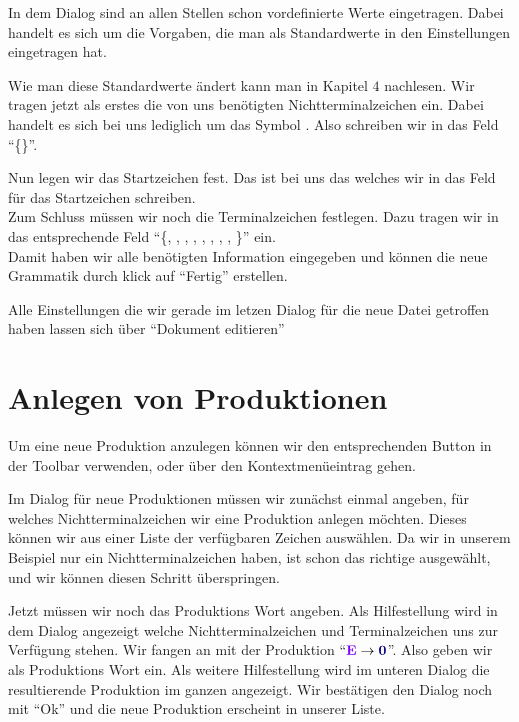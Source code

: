 In dem Dialog sind an allen Stellen schon vordefinierte Werte eingetragen.
Dabei handelt es sich um die Vorgaben, die man als Standardwerte in den
Einstellungen eingetragen hat.

Wie man diese Standardwerte ändert kann man in Kapitel $4$ nachlesen. Wir tragen
jetzt als erstes die von uns benötigten Nichtterminalzeichen ein. Dabei handelt
es sich bei uns lediglich um das Symbol . Also schreiben wir in
das Feld "`\{\}"'.\vspace{10pt}

Nun legen wir das Startzeichen fest. Das ist bei uns das 
welches wir in das Feld für das Startzeichen schreiben.\\
Zum Schluss müssen wir noch die Terminalzeichen festlegen. Dazu tragen
wir in das entsprechende Feld "`\{, ,
, , \TerminalSymbol{-}, \TerminalSymbol{+},
\TerminalSymbol{*}, \TerminalSymbol{(}, \TerminalSymbol{)}\}"' ein.\\ Damit
haben wir alle benötigten Information eingegeben und können die neue Grammatik durch klick auf "`Fertig"' erstellen.\vspace{10pt}

Alle Einstellungen die wir gerade im letzen Dialog für die neue Datei getroffen
haben lassen sich über "`Dokument editieren"'

\section{Anlegen von Produktionen}

Um eine neue Produktion anzulegen können wir den entsprechenden Button in der
Toolbar verwenden, oder über den Kontextmenüeintrag gehen.\vspace{10pt}

Im Dialog für neue Produktionen müssen wir zunächst einmal angeben, für welches
Nichtterminalzeichen wir eine Produktion anlegen möchten. Dieses können wir aus
einer Liste der verfügbaren Zeichen auswählen. Da wir in unserem Beispiel nur
ein Nichtterminalzeichen haben, ist schon das richtige ausgewählt, und wir
können diesen Schritt überspringen.\vspace{10pt}

Jetzt müssen wir noch das Produktions Wort angeben. Als Hilfestellung wird in
dem Dialog angezeigt welche Nichtterminalzeichen und Terminalzeichen uns zur
Verfügung stehen. Wir fangen an mit der Produktion "`$\StartSymbol{E} \to
\TerminalSymbol{0}$"'. Also geben wir als Produktions Wort 
ein. Als weitere Hilfestellung wird im unteren Dialog die resultierende Produktion im ganzen angezeigt. Wir bestätigen den
Dialog noch mit "`Ok"' und die neue Produktion erscheint in unserer Liste.\vspace{10pt}

